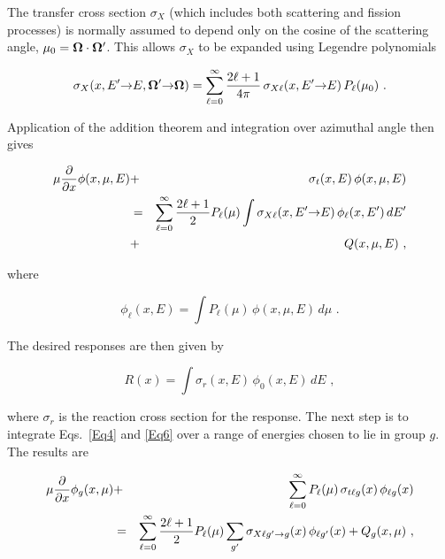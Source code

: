 The transfer cross section $\sigma_X$ (which includes both scattering
and fission processes) is normally assumed to depend only on the cosine
of the scattering angle, $\mu_0={\bf\Omega}\cdot{\bf\Omega}'$.  This
allows $\sigma_X$ to be expanded using Legendre polynomials

  \begin{equation}
    \sigma_X(x,E'{\rightarrow}E,
    {\bf\Omega}'{\rightarrow}{\bf\Omega})=
    \sum_{\ell=0}^{\infty}
    {{2\ell+1} \over 4\pi}\,\sigma_{X\ell}(x,E'{\rightarrow}
    E)\,P_\ell(\mu_0)\,\,.\\
  \end{equation}

\noindent
Application of the addition theorem and integration over azimuthal angle
then gives

  \begin{eqnarray}
    \mu{{\partial}\over{\partial x}}\phi(x,\mu,E)&+&\sigma_t(x,E)
    \,\phi(x,\mu,E)\nonumber\\
    &=& \sum_{\ell=0}^{\infty}{{2\ell+1}\over 2}
    P_{\ell}(\mu)\int\sigma_{X\ell}(x,E'{\rightarrow}E)
    \,\phi_{\ell}(x,E')\,dE'\nonumber\\
    &+&Q(x,\mu,E)\,\,,
  \label{Eq4}
  \end{eqnarray}

\noindent
where

  \begin{equation}
    \phi_\ell(x,E)=\int P_\ell(\mu) \,\phi(x,\mu,E)\,d\mu\,\,.
  \end{equation}

\noindent
The desired responses are then given by

  \begin{equation}
    R(x)=\int\sigma_r(x,E)\,\phi_0(x,E)\,dE\,\,,
  \label{Eq6}
  \end{equation}

\noindent
where $\sigma_r$ is the reaction cross section for the response.  The next
step is to integrate Eqs.~\ref{Eq4} and \ref{Eq6} over a range of
energies chosen to lie in group $g$.  The results are

  \begin{eqnarray}
    \mu{{\partial}\over\partial x}\phi_g(x,\mu)&+&
    \sum_{\ell=0}^{\infty}P_{\ell}(\mu)\,\sigma_{t\ell g}(x)
    \,\phi_{\ell g}(x)\nonumber\\
    &=& \sum_{\ell=0}^{\infty}{{2\ell+1}\over 2}P_{\ell}(\mu)
    \sum_{g'}\sigma_{X\ell g'\rightarrow g}(x)\,\phi_{\ell g'}(x)
    +Q_g(x,\mu)\,\,,
  \label{Eq7}
  \end{eqnarray}

